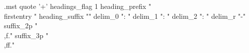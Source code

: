 \begin{filecontents*}{\jobname.mst}
	quote '+'
	headings_flag 1
	heading_prefix "\\firstentry "
	heading_suffix ""
	delim_0 ": "
	delim_1 ": "
	delim_2 ": "
	delim_r "-"
	suffix_2p "\\,f."
	suffix_3p "\\,ff."
\end{filecontents*}

\documentclass[11pt,a4paper]{article}
\usepackage[utf8]{inputenc}
\usepackage[italian]{babel}
\usepackage{amsmath}
\usepackage{amsfonts}
\usepackage{amssymb}
\usepackage{array}
\usepackage{graphicx}
\usepackage{multirow}
\usepackage{color,colortbl}
\usepackage[hidelinks]{hyperref}
\usepackage{fancyhdr}
\usepackage{tabularx}
\usepackage{csquotes}
\usepackage[left=2cm,right=2cm,top=2cm,bottom=3cm]{geometry}
\usepackage{longtable}
\usepackage{lastpage}
\usepackage{hyperref}
\hypersetup{colorlinks,urlcolor=blue,linkcolor=black}
\usepackage[nottoc]{tocbibind}
\usepackage{makeidx}
\usepackage[indentunit=0.75em]{idxlayout}

\makeindex
\def\firstentry#1\item#2{\item\textbf{#2}}

\pagestyle{fancy}
\fancyhf{}


